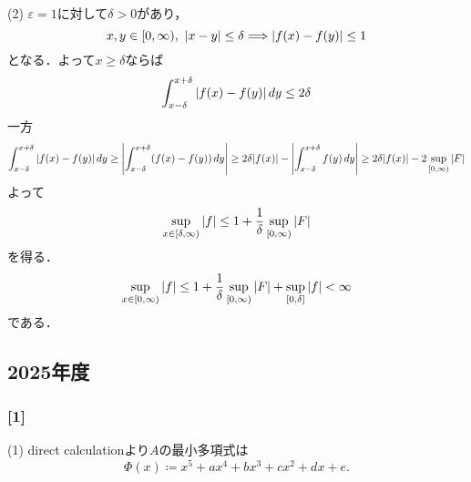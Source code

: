 \documentclass[a4j]{ltjsarticle}
\newcommand{\1}{\mathbbm{1}}
\numberwithin{equation}{section}
\theoremstyle{definition}
\begin{document}
(2) $\varepsilon=1$に対して$\delta>0$があり，
\begin{equation}
    x,y\in [0,\infty),\ \abs{x-y}\leq \delta\Longrightarrow \abs{f(x)-f(y)}\leq 1 
\end{equation}
となる．よって$x\geq \delta$ならば
\begin{equation}
    \int_{x-\delta}^{x+\delta}\abs{f(x)-f(y)}\,dy\leq 2\delta
\end{equation}
一方
\begin{equation}
    \int_{x-\delta}^{x+\delta}\abs{f(x)-f(y)}\,dy\geq \abs{\int_{x-\delta}^{x+\delta}(f(x)-f(y))\,dy}\geq2\delta\abs{f(x)}-\abs{\int_{x-\delta}^{x+\delta}f(y)\,dy}\geq 2\delta\abs{f(x)}-2\sup_{[0,\infty)}\abs{F}
\end{equation}
よって
\begin{equation}
    \sup_{x\in[\delta,\infty)}\abs{f}\leq 1+\frac{1}{\delta}\sup_{[0,\infty)}\abs{F}
\end{equation}
を得る．
\begin{equation}
    \sup_{x\in[0,\infty)}\abs{f}\leq 1+\frac{1}{\delta}\sup_{[0,\infty)}\abs{F}+\sup_{[0,\delta]}\abs{f}<\infty 
\end{equation}
である．

\subsection{2025年度}
\subsubsection*{[1]}
(1) direct calculationより$A$の最小多項式は
\begin{equation}
    \Phi(x)\coloneq x^5+ax^4+bx^3+cx^2+dx+e .
\end{equation}
\end{document}
